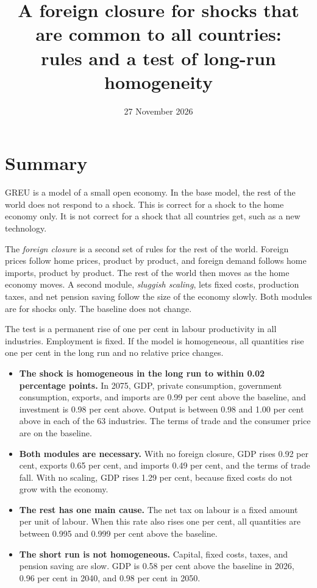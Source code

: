 \documentclass[11pt,a4paper]{article}
\title{A foreign closure for shocks that are common to all countries:\\ rules and a test of long-run homogeneity}
\author{}
\date{27 November 2026}
\begin{document}
\maketitle

\section{Summary}

GREU is a model of a small open economy. In the base model, the rest of the world does not respond to a shock.
This is correct for a shock to the home economy only. It is not correct for a shock that all countries get, such as a new technology.

The \emph{foreign closure} is a second set of rules for the rest of the world. Foreign prices follow home prices, product by product, and foreign demand follows home imports, product by product. The rest of the world then moves as the home economy moves.
A second module, \emph{sluggish scaling}, lets fixed costs, production taxes, and net pension saving follow the size of the economy slowly.
Both modules are for shocks only. The baseline does not change.

The test is a permanent rise of one per cent in labour productivity in all industries. Employment is fixed.
If the model is homogeneous, all quantities rise one per cent in the long run and no relative price changes.

\begin{itemize}
\item \textbf{The shock is homogeneous in the long run to within 0.02 percentage points.} In 2075, GDP, private consumption, government consumption, exports, and imports are 0.99 per cent above the baseline, and investment is 0.98 per cent above. Output is between 0.98 and 1.00 per cent above in each of the 63 industries. The terms of trade and the consumer price are on the baseline.
\item \textbf{Both modules are necessary.} With no foreign closure, GDP rises 0.92 per cent, exports 0.65 per cent, and imports 0.49 per cent, and the terms of trade fall. With no scaling, GDP rises 1.29 per cent, because fixed costs do not grow with the economy.
\item \textbf{The rest has one main cause.} The net tax on labour is a fixed amount per unit of labour. When this rate also rises one per cent, all quantities are between 0.995 and 0.999 per cent above the baseline.
\item \textbf{The short run is not homogeneous.} Capital, fixed costs, taxes, and pension saving are slow. GDP is 0.58 per cent above the baseline in 2026, 0.96 per cent in 2040, and 0.98 per cent in 2050.
\end{itemize}
\end{document}
